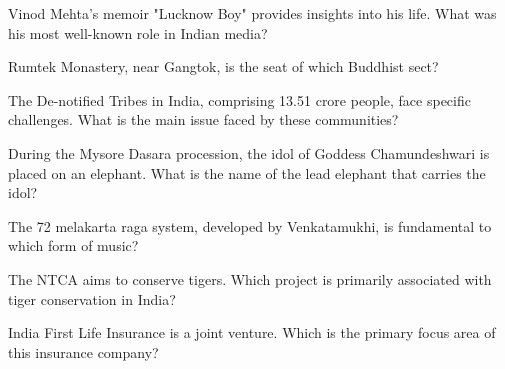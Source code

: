 \documentclass[12pt,a4paper]{book}
\begin{document}
\begin{enhancedmcq}[Question 32]{Vinod Mehta's memoir "Lucknow Boy" provides insights into his life. What was his most well-known role in Indian media?}
\end{enhancedmcq}

\begin{enhancedmcq}[Question 33]{Rumtek Monastery, near Gangtok, is the seat of which Buddhist sect?}
\end{enhancedmcq}

\begin{enhancedmcq}[Question 34]{The De-notified Tribes in India, comprising 13.51 crore people, face specific challenges. What is the main issue faced by these communities?}
\end{enhancedmcq}

\begin{enhancedmcq}[Question 35]{During the Mysore Dasara procession, the idol of Goddess Chamundeshwari is placed on an elephant. What is the name of the lead elephant that carries the idol?}
\end{enhancedmcq}

\begin{enhancedmcq}[Question 36]{The 72 melakarta raga system, developed by Venkatamukhi, is fundamental to which form of music?}
\end{enhancedmcq}

\begin{enhancedmcq}[Question 37]{The NTCA aims to conserve tigers. Which project is primarily associated with tiger conservation in India?}
\end{enhancedmcq}

\begin{enhancedmcq}[Question 38]{India First Life Insurance is a joint venture. Which is the primary focus area of this insurance company?}
\end{enhancedmcq}
\end{document}
